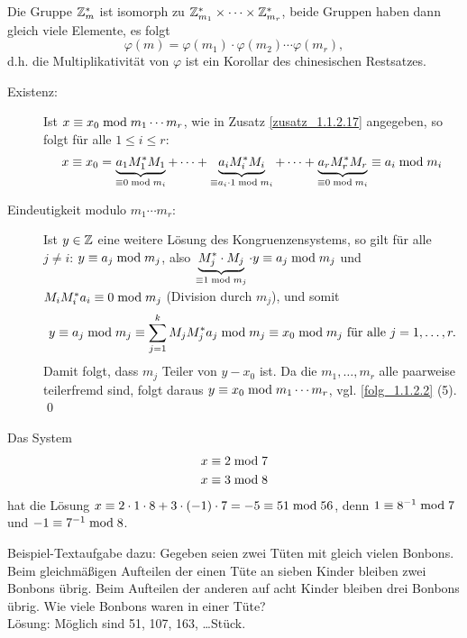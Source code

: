 \begin{zusatz}
\label{zusatz_1.1.2.18}
	Die Gruppe $\mathbb{Z}_m^*$ ist isomorph zu $\mathbb{Z}_{m_1}^* \times \dots \times \mathbb{Z}_{m_r}^*$, beide Gruppen haben dann gleich viele Elemente, es folgt
	\[ \varphi(m) = \varphi(m_1) \cdot \varphi(m_2) \cdots \varphi(m_r), \]
	d.h. die Multiplikativität von $\varphi$ ist ein Korollar des chinesischen Restsatzes.
\end{zusatz}

	\begin{description}
		\item[Existenz:] Ist $x \equiv x_0 \bmod m_1 \cdots m_r$, wie in Zusatz \ref{zusatz_1.1.2.17} angegeben, so folgt für alle $1 \leq i \leq r$:
		\[ x \equiv x_0 = \underbrace{a_1 M_1^* M_1}_{\equiv 0 \bmod m_i} + \dots + \underbrace{a_i M_i^* M_i}_{\equiv a_i \cdot 1 \bmod m_i} + \dots + \underbrace{a_r M_r^* M_r}_{\equiv 0 \bmod m_i} \equiv a_i \bmod m_i \]
		\item[Eindeutigkeit modulo $m_1 \cdots m_r$:] Ist $y \in \mathbb{Z}$ eine weitere Lösung des Kongruenzensystems, so gilt für alle $j \neq i$: $y \equiv a_j \bmod m_j$, also $\underbrace{M_j^* \cdot M_j}_{\equiv 1 \bmod m_j} \cdot y \equiv a_j \bmod m_j$ und $M_i M_i^* a_i \equiv 0 \bmod m_j$ (Division durch $m_j$), und somit
		\[ y \equiv a_j \bmod m_j \equiv \sum_{j=1}^{k} M_j M_j^* a_j \bmod m_j \equiv x_0 \bmod m_j \text{ für alle } j=1,\dots,r. \]
		Damit folgt, dass $m_j$ Teiler von $y-x_0$ ist. 
		Da die $m_1, \dots, m_r$ alle paarweise teilerfremd sind, folgt daraus $y \equiv x_0 \bmod m_1 \cdots m_r$, vgl. \ref{folg_1.1.2.2} (5). \qed
	\end{description}
	
	Das System
	\begin{equation}
	\begin{aligned}
		x \equiv 2 \bmod 7 \\
		x \equiv 3 \bmod 8
	\end{aligned}
	\end{equation}
	hat die Lösung $x \equiv 2 \cdot 1 \cdot 8 + 3 \cdot (-1) \cdot 7 = -5 \equiv 51 \bmod 56$, denn $1 \equiv 8^{-1} \bmod 7$ und $-1 \equiv 7^{-1} \bmod 8$.
	
	Beispiel-Textaufgabe dazu: Gegeben seien zwei Tüten mit gleich vielen Bonbons. 
	Beim gleichmäßigen Aufteilen der einen Tüte an sieben Kinder bleiben zwei Bonbons übrig. 
	Beim Aufteilen der anderen auf acht Kinder bleiben drei Bonbons übrig. 
	Wie viele Bonbons waren in einer Tüte? \\
	Lösung: Möglich sind 51, 107, 163, \dots Stück. 
	
